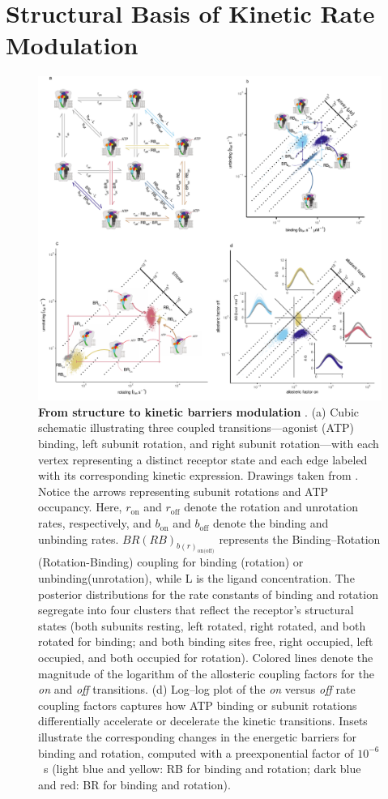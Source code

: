 \documentclass[pdflatex,sn-nature]{sn-jnl}%
\theoremstyle{thmstyleone}%
\theoremstyle{thmstyletwo}%
\theoremstyle{thmstylethree}%
\begin{document}
\section{Structural Basis of Kinetic Rate Modulation}
\begin{figure}[!htbp]
	\centering
	\includegraphics[width=\linewidth]{Figure_3_scheme_10.pdf}
	\caption{\textbf{From structure to kinetic barriers modulation} . (a) Cubic schematic illustrating three coupled transitions—agonist (ATP) binding, left subunit rotation, and right subunit rotation—with each vertex representing a distinct receptor state and each edge labeled with its corresponding kinetic expression. Drawings taken from \cite{abierta_p2x}. Notice the arrows representing subunit rotations and ATP occupancy. Here, $r_{\text{on}}$ and $r_{\text{off}}$ denote the rotation and unrotation rates, respectively, and $b_{\text{on}}$ and $b_{\text{off}}$ denote the binding and unbinding rates. $BR(RB)_{b(r)_{\text{on(off)}}}$ represents the Binding–Rotation (Rotation-Binding) coupling for binding (rotation) or unbinding(unrotation), while L is the ligand concentration. The posterior distributions for the rate constants of binding and rotation segregate into four clusters that reflect the receptor’s structural states (both subunits resting, left rotated, right rotated, and both rotated for binding; and both binding sites free, right occupied, left occupied, and both occupied for rotation). Colored lines denote the magnitude of the logarithm of the allosteric coupling factors for the \textit{on} and \textit{off} transitions. (d) Log–log plot of the \textit{on} versus \textit{off} rate coupling factors captures how ATP binding or subunit rotations differentially accelerate or decelerate the kinetic transitions. Insets illustrate the corresponding changes in the energetic barriers for binding and rotation, computed with a preexponential factor of $10^{-6}$~s (light blue and yellow: RB for binding and rotation; dark blue and red: BR for binding and rotation). }
	\label{fig:rates_SchemeX}
\end{figure}
\end{document}
